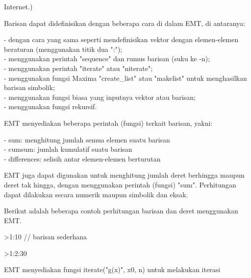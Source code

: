 \documentclass[12pt,arial,letterpaper]{book}
\begin{document}
\begin{eulercomment}
\begin{eulercomment}
\begin{eulercomment}
\begin{eulercomment}
\begin{eulercomment}
\begin{eulercomment}
\begin{eulercomment}
\begin{eulercomment}
\begin{eulercomment}
\begin{eulercomment}
\begin{eulercomment}
\begin{eulercomment}
\begin{eulercomment}
\begin{eulercomment}
\begin{eulercomment}
\begin{eulercomment}
\begin{eulercomment}
\begin{eulercomment}
\begin{eulercomment}
\begin{eulercomment}
\begin{eulercomment}
\begin{eulercomment}
\begin{eulercomment}
Internet.)

Barisan dapat didefinisikan dengan beberapa cara di dalam EMT, di
antaranya:

- dengan cara yang sama seperti mendefinisikan vektor dengan
elemen-elemen beraturan (menggunakan titik dua ":");\\
- menggunakan perintah "sequence" dan rumus barisan (suku ke -n);\\
- menggunakan perintah "iterate" atau "niterate";\\
- menggunakan fungsi Maxima "create\_list" atau "makelist" untuk
menghasilkan barisan simbolik;\\
- menggunakan fungsi biasa yang inputnya vektor atau barisan;\\
- menggunakan fungsi rekursif.

EMT menyediakan beberapa perintah (fungsi) terkait barisan, yakni:

- sum: menghitung jumlah semua elemen suatu barisan\\
- cumsum: jumlah kumulatif suatu barisan\\
- differences: selisih antar elemen-elemen berturutan

EMT juga dapat digunakan untuk menghitung jumlah deret berhingga
maupun deret tak hingga, dengan menggunakan perintah (fungsi) "sum".
Perhitungan dapat dilakukan secara numerik maupun simbolik dan eksak.

Berikut adalah beberapa contoh perhitungan barisan dan deret
menggunakan EMT.
\end{eulercomment}
\begin{eulerprompt}
>1:10 // barisan sederhana
\end{eulerprompt}
\begin{euleroutput}
  [1,  2,  3,  4,  5,  6,  7,  8,  9,  10]
\end{euleroutput}
\begin{eulerprompt}
>1:2:30
\end{eulerprompt}
\begin{euleroutput}
  [1,  3,  5,  7,  9,  11,  13,  15,  17,  19,  21,  23,  25,  27,  29]
\end{euleroutput}
\begin{eulercomment}
EMT menyediakan fungsi iterate("g(x)", x0, n) untuk melakukan iterasi


\end{eulercomment}
\end{eulercomment}
\end{eulercomment}
\end{eulercomment}
\end{eulercomment}
\end{eulercomment}
\end{eulercomment}
\end{eulercomment}
\end{eulercomment}
\end{eulercomment}
\end{eulercomment}
\end{eulercomment}
\end{eulercomment}
\end{eulercomment}
\end{eulercomment}
\end{eulercomment}
\end{eulercomment}
\end{eulercomment}
\end{eulercomment}
\end{eulercomment}
\end{eulercomment}
\end{eulercomment}
\end{eulercomment}
\end{document}
